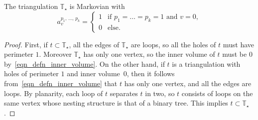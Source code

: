 \documentclass[AHL,Unicode,longabstracts,published]{cedram}
\newcommand{\TT}{\mathbb{T}}
\begin{document}
\begin{lemm}\label{lem_Tstar}
The triangulation $\TT_{\star}$ is Markovian with
\[
a^{p_1,\, \dots,\,p_k}_v =
\begin{cases}
1 & \text{if }p_1=\dots=p_k=1\text{ and }v=0,\\
0 & \text{else.}
\end{cases}
\]
\end{lemm}

\begin{proof}
First, if $t \subset \TT_{\star}$, all the edges of $\TT_{\star}$ are loops, so all the holes of $t$ must have perimeter $1$. Moreover $\TT_{\star}$ has only one vertex, so the inner volume of $t$ must be $0$ by~\eqref{eqn_defn_inner_volume}. On the other hand, if $t$ is a triangulation with holes of perimeter $1$ and inner volume~$0$, then it follows from~\eqref{eqn_defn_inner_volume} that $t$ has only one vertex, and all the edges are loops. By planarity, each loop of $t$ separates $t$ in two, so $t$ consists of loops on the same vertex whose nesting structure is that of a binary tree. This implies $t \subset \TT_{\star}$.
\end{proof}
\end{document}

